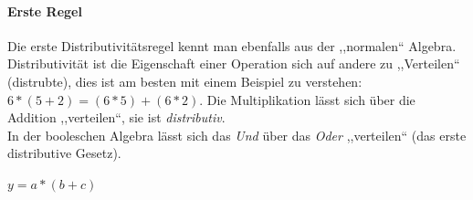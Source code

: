\documentclass{article}
\begin{document}
\paragraph{Erste Regel} Die erste Distributivitätsregel kennt man ebenfalls aus der ,,normalen`` Algebra. Distributivität 
ist die Eigenschaft einer Operation sich auf andere zu ,,Verteilen`` (distrubte), dies ist am besten mit einem Beispiel zu verstehen:
$6*(5+2) = (6*5)+(6*2)$. Die Multiplikation lässt sich über die Addition ,,verteilen``, sie ist \emph{distributiv}.  \\
In der booleschen Algebra lässt sich das \emph{Und} über das \emph{Oder} ,,verteilen`` (das erste distributive Gesetz).


\noindent\begin{minipage}{.45\linewidth}
    \begin{center} $y = a * (b + c)$ \end{center}
    \vspace{2em}
    \center
    \begin{multicols}{2}


\end{multicols}
\end{minipage}
\end{document}

